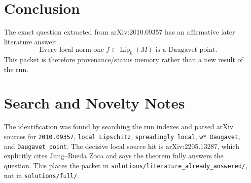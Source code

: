 \documentclass[11pt]{article}
\newcommand{\Lip}{\operatorname{Lip}_0}
\begin{document}
\section*{Conclusion}

The exact question extracted from arXiv:2010.09357 has an affirmative later
literature answer:
\[
  \boxed{\text{Every local norm-one } f\in\Lip(M) \text{ is a Daugavet point.}}
\]
This packet is therefore provenance/status memory rather than a new result of
the run.

\section*{Search and Novelty Notes}

The identification was found by searching the run indexes and parsed arXiv
sources for \texttt{2010.09357}, \texttt{local Lipschitz},
\texttt{spreadingly local}, \texttt{w* Daugavet}, and \texttt{Daugavet point}.
The decisive local source hit is arXiv:2205.13287, which explicitly cites
Jung--Rueda Zoca and says the theorem fully answers the question. This places
the packet in \texttt{solutions/literature\_already\_answered/}, not in
\texttt{solutions/full/}.
\end{document}
